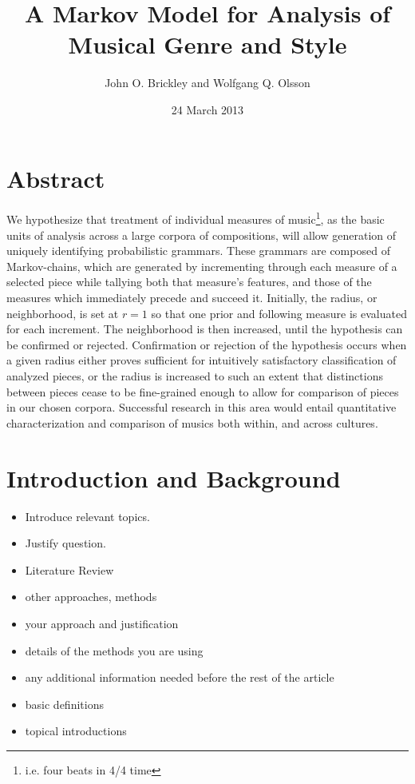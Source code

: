 \documentclass{article}
\title{A Markov Model for Analysis of Musical Genre and Style}
\author{John O. Brickley and Wolfgang Q. Olsson}
\date{24 March 2013}
\begin{document}
 \maketitle
 \doublespace

 \section{Abstract} We hypothesize that treatment of individual measures of music\footnote{i.e. four beats in 4/4 time}, as the basic units of analysis across a large corpora of compositions, will allow generation of uniquely identifying probabilistic grammars. These grammars are composed of Markov-chains, which are generated by incrementing through each measure of a selected piece while tallying both that measure’s features, and those of the measures which immediately precede and succeed it. Initially, the radius, or neighborhood, is set at $r = 1$ so that one prior and following measure is evaluated for each increment. The neighborhood is then increased, until the hypothesis can be confirmed or rejected. Confirmation or rejection of the hypothesis occurs when a given radius either proves sufficient for intuitively satisfactory classification of analyzed pieces, or the radius is increased to such an extent that distinctions between pieces cease to be fine-grained enough to allow for comparison of pieces in our chosen corpora. Successful research in this area would entail quantitative characterization and comparison of musics both within, and across cultures.


 \singlespace
 \section{Introduction and Background}
 \begin{itemize}
     \item Introduce relevant topics.
     \item Justify question.
     \item Literature Review
     \item other approaches, methods
     \item your approach and justification
     \item details of the methods you are using
     \item any additional information needed before the rest of the article
     \item basic definitions
     \item topical introductions
 \end{itemize}
\end{document}

